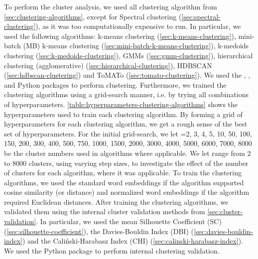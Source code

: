 To perform the cluster analysis, we used all clustering algorithm from \cref{sec:clustering-algorithms}, except for Spectral clustering (\cref{sec:spectral-clustering}), as it was too computationally expensive to run. In particular, we used the following algorithms: k-means clustering (\cref{sec:k-means-clustering}), mini-batch (MB) k-means clustering (\cref{sec:mini-batch-k-means-clustering}), k-medoids clustering (\cref{sec:k-medoids-clustering}), GMMs (\cref{sec:gmm-clustering}), hierarchical clustering (agglomerative) (\cref{sec:hierarchical-clustering}), HDBSCAN (\cref{sec:hdbscan-clustering}) and ToMATo (\cref{sec:tomato-clustering}). We used the  \cite{ScikitLearn2011},  \cite{ScikitLearnExtra2021},  \cite{gudhi2021} and  \cite{mcinnes2017hdbscan} Python packages to perform clustering. Furthermore, we trained the clustering algorithms using a grid-search manner, i.e. by trying all combinations of hyperparameters. \cref{table:hyperparameters-clustering-algorithms} shows the hyperparameters used to train each clustering algorithm. By forming a grid of hyperparameters for each clustering algorithm, we get a rough sense of the best set of hyperparameters. For the initial grid-search, we let =2, 3, 4, 5, 10, 50, 100, 150, 200, 300, 400, 500, 750, 1000, 1500, 2000, 3000, 4000, 5000, 6000, 7000, 8000 be the cluster numbers used in algorithms where applicable. We let  range from 2 to 8000 clusters, using varying step sizes, to investigate the effect of the number of clusters for each algorithm, where it was applicable. To train the clustering algorithms, we used the standard word embeddings if the algorithm supported cosine similarity (or distance) and normalized word embeddings if the algorithm required Euclidean distances. After training the clustering algorithms, we validated them using the internal cluster validation methods from \cref{sec:cluster-validation}. In particular, we used the mean Silhouette Coefficient (SC) (\cref{sec:silhouette-coefficient}), the Davies-Bouldin Index (DBI) (\cref{sec:davies-bouldin-index}) and the Caliński-Harabasz Index (CHI) (\cref{sec:calinski-harabasz-index}). We used the  Python package to perform internal clustering validation.
